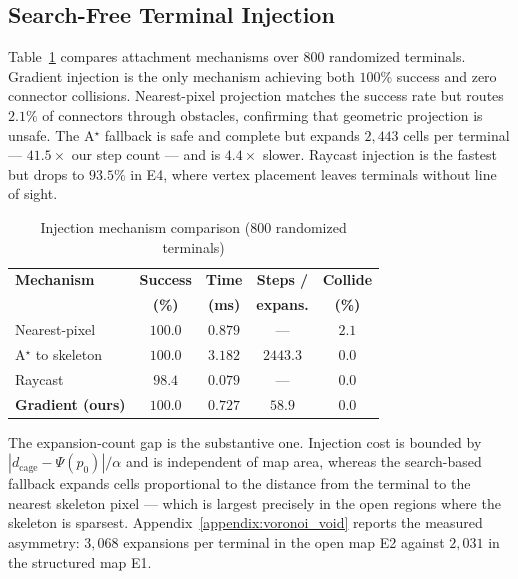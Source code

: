 \documentclass[conference]{IEEEtran}
\begin{document}
\subsection{Search-Free Terminal Injection}
\label{sec:res-injection}
Table~\ref{tab:injection} compares attachment mechanisms over $800$ randomized terminals. Gradient injection is the only mechanism achieving both $100\%$ success and zero connector collisions. Nearest-pixel projection matches the success rate but routes $2.1\%$ of connectors through obstacles, confirming that geometric projection is unsafe. The A$^\star$ fallback is safe and complete but expands $2{,}443$ cells per terminal --- $41.5\times$ our step count --- and is $4.4\times$ slower. Raycast injection is the fastest but drops to $93.5\%$ in E4, where vertex placement leaves terminals without line of sight.
\begin{table}[htbp]
\caption{Injection mechanism comparison (800 randomized terminals)}
\label{tab:injection}
\begin{center}
\begin{tabular}{@{}lcccc@{}}
\toprule
\textbf{Mechanism} & \textbf{Success} & \textbf{Time} & \textbf{Steps /} & \textbf{Collide} \\
 & \textbf{(\%)} & \textbf{(ms)} & \textbf{expans.} & \textbf{(\%)} \\ \midrule
Nearest-pixel & $100.0$ & $0.879$ & --- & $2.1$ \\
A$^\star$ to skeleton & $100.0$ & $3.182$ & $2443.3$ & $0.0$ \\
Raycast~\cite{qi2025egvg} & $98.4$ & $\mathbf{0.079}$ & --- & $0.0$ \\
\textbf{Gradient (ours)} & $\mathbf{100.0}$ & $0.727$ & $\mathbf{58.9}$ & $\mathbf{0.0}$ \\ \bottomrule
\end{tabular}
\end{center}
\end{table}
The expansion-count gap is the substantive one. Injection cost is bounded by $|d_{\mathrm{cage}}-\Psi(p_0)|/\alpha$ and is independent of map area, whereas the search-based fallback expands cells proportional to the distance from the terminal to the nearest skeleton pixel --- which is largest precisely in the open regions where the skeleton is sparsest. Appendix~\ref{appendix:voronoi_void} reports the measured asymmetry: $3{,}068$ expansions per terminal in the open map E2 against $2{,}031$ in the structured map E1.
\end{document}
